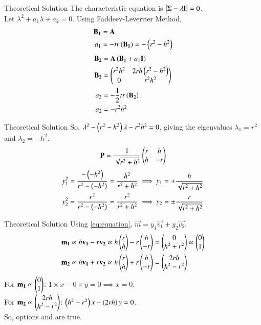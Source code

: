 \documentclass{beamer}
\begin{document}
\begin{frame}{Theoretical Solution}
    The characteristic equation is $\begin{vmatrix}\mathbf{\Sigma}-\lambda\mathbf{I}\end{vmatrix}=0$. \\
Let $\lambda^2 + a_1 \lambda + a_2 = 0$. Using Faddeev-Leverrier Method,
\begin{align}
    \mathbf{B_1} &= \mathbf{A} \\
    a_1 &= - tr\left(\mathbf{B_1}\right) = -\left(r^2-h^2\right)
\end{align}
\begin{align}
    \mathbf{B_2} &= \mathbf{A}\left(\mathbf{B_1} + a_1\mathbf{I}\right) \\
    \mathbf{B_2} &= \begin{pmatrix}r^2h^2 & 2rh\left(r^2-h^2\right) \\ 0 & r^2h^2\end{pmatrix} \\
    a_2 &= -\frac{1}{2}tr\left(\mathbf{B_2}\right) \\
    a_2 &= -r^2h^2
\end{align}
\end{frame}

\begin{frame}{Theoretical Solution}
    So, $\lambda^2 - \left(r^2-h^2\right)\lambda - r^2h^2 = 0$, giving the eigenvalues $\lambda_1 = r^2$ and $\lambda_2 = -h^2$.
\begin{align}
    \mathbf{P} = \frac{1}{\sqrt{r^2+h^2}}\begin{pmatrix}r & h \\ h & -r\end{pmatrix}
\end{align}
\begin{align}
    y_1^2 = \frac{-\left(-h^2\right)}{r^2-\left(-h^2\right)} = \frac{h^2}{r^2+h^2} \implies y_1 = \pm\frac{h}{\sqrt{r^2+h^2}} \\
    y_2^2 = \frac{r^2}{r^2-\left(-h^2\right)} = \frac{r^2}{r^2+h^2} \implies y_2 = \pm\frac{r}{\sqrt{r^2+h^2}}
\end{align}
\end{frame}

\begin{frame}{Theoretical Solution}
    Using \eqref{eq:equation}, $\vec{m} = y_1\vec{v_1}+y_2\vec{v_2}$.
\begin{align}
    \mathbf{m_1} &\propto h\mathbf{v_1} - r\mathbf{v_2} \propto h\begin{pmatrix}r \\ h\end{pmatrix} - r\begin{pmatrix}h \\ -r\end{pmatrix} = \begin{pmatrix}0 \\ h^2+r^2\end{pmatrix} \propto \begin{pmatrix}0 \\ 1\end{pmatrix} \\
    \mathbf{m_2} &\propto h\mathbf{v_1} + r\mathbf{v_2} \propto h\begin{pmatrix}r \\ h\end{pmatrix} + r\begin{pmatrix}h \\ -r\end{pmatrix} = \begin{pmatrix}2rh \\ h^2-r^2\end{pmatrix}
\end{align}
For $\mathbf{m_1} \propto \begin{pmatrix}0 \\ 1\end{pmatrix}$: $1 \times x - 0 \times y = 0 \implies x = 0$. \\
For $\mathbf{m_2} \propto \begin{pmatrix}2rh \\ h^2-r^2\end{pmatrix}$: $\left(h^2-r^2\right)x - \left(2rh\right)y = 0$. \\
So, options \textbf{} and \textbf{} are true.
\end{frame}
\end{document}
